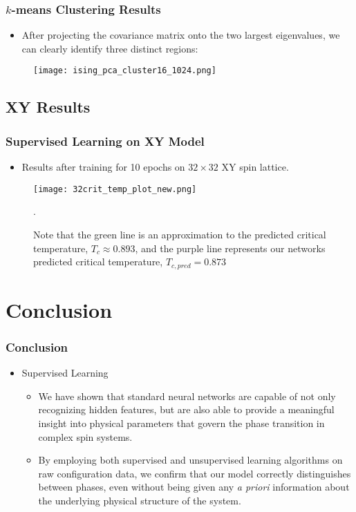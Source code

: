 \documentclass{beamer}
\begin{document}
\begin{frame}
\frametitle{$k$-means Clustering Results}
	\begin{itemize}
		\item After projecting the covariance matrix onto the two largest eigenvalues, we can clearly
			identify three distinct regions:
	\end{itemize}
	\begin{figure}
		\texttt{[image: ising\_pca\_cluster16\_1024.png]}
	\end{figure}
\end{frame}


\subsection{XY Results}
\begin{frame}
	\frametitle{Supervised Learning on XY Model}
	\begin{itemize}
		\item Results after training for 10 epochs on $32\times 32$ XY spin lattice.
	\end{itemize}
	\begin{figure}
		\texttt{[image: 32crit\_temp\_plot\_new.png]}
		\caption{Note that the green line is an approximation to the predicted critical temperature,
			$ T_c \approx 0.893 $, and the purple line represents our networks predicted critical
			temperature, $T_{c, pred} = 0.873$}.
	\end{figure}
\end{frame}

\section{Conclusion}
\frametitle{Conclusion}
\begin{frame}
	\begin{itemize}
		\item Supervised Learning
			\begin{itemize}
				\item We have shown that standard neural networks are capable of not only recognizing hidden features, but are also
					able to provide a meaningful insight into physical parameters that govern the phase transition in complex spin systems.
				\item By employing both supervised and unsupervised learning algorithms on raw configuration data, we confirm that our model
					correctly distinguishes between phases, even without being given any \textit{a priori} information about
					the underlying physical structure of the system.
			\end{itemize}
	\end{itemize}
\end{frame}
\end{document}
